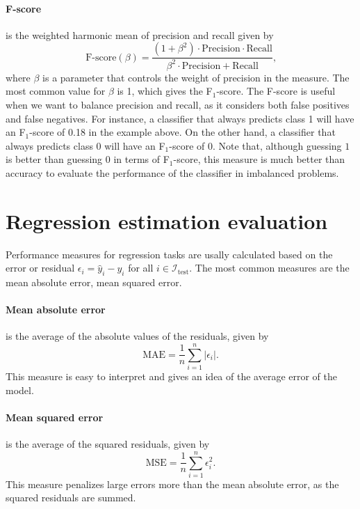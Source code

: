 \paragraph{F-score} is the weighted harmonic mean of precision and recall given by
\begin{equation*}
  \text{F-score}(\beta) =
    \frac%
      {(1 + \beta^2) \cdot \text{Precision} \cdot \text{Recall}}
      {\beta^2 \cdot \text{Precision} + \text{Recall}}\text{,}
\end{equation*}
where $\beta$ is a parameter that controls the weight of precision in the measure.  The
most common value for $\beta$ is 1, which gives the F$_1$-score.  The F-score is useful
when we want to balance precision and recall, as it considers both false positives and
false negatives.  For instance, a classifier that always predicts class 1 will have an
F$_1$-score of 0.18 in the example above.  On the other hand, a classifier that always
predicts class 0 will have an F$_1$-score of 0.  Note that, although guessing $1$ is
better than guessing $0$ in terms of F$_1$-score, this measure is much better than
accuracy to evaluate the performance of the classifier in imbalanced problems.


\section{Regression estimation evaluation}

Performance measures for regression tasks are usally calculated based on the error or residual
$\epsilon_i = \hat{y}_i - y_i$ for all $i \in \mathcal{I}_\text{test}$.  The most common measures
are the mean absolute error, mean squared error.

\paragraph{Mean absolute error} is the average of the absolute values of the residuals,
given by
\begin{equation*}
  \text{MAE} = \frac{1}{n} \sum_{i=1}^n | \epsilon_i |\text{.}
\end{equation*}
This measure is easy to interpret and gives an idea of the average error of the model.

\paragraph{Mean squared error} is the average of the squared residuals, given by
\begin{equation*}
  \text{MSE} = \frac{1}{n} \sum_{i=1}^n \epsilon_i^2\text{.}
\end{equation*}
This measure penalizes large errors more than the mean absolute error, as the squared
residuals are summed.

